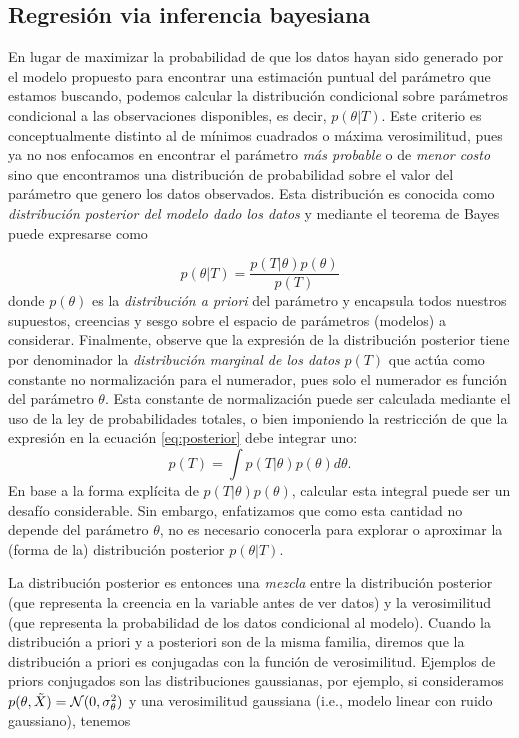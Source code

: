 \subsection{Regresión via inferencia bayesiana} %
\label{sub:inferencia_bayes}

En lugar de maximizar la probabilidad de que los datos hayan sido generado por el modelo propuesto para encontrar una estimación puntual del parámetro que estamos buscando, podemos calcular la distribución condicional sobre parámetros condicional a las observaciones disponibles, es decir, $p(\theta|T)$. Este criterio es conceptualmente distinto al de mínimos cuadrados o máxima verosimilitud, pues ya no nos enfocamos en encontrar el parámetro \emph{más probable} o de \emph{menor costo} sino que encontramos una distribución de probabilidad sobre el valor del parámetro que genero los datos observados. Esta distribución es conocida como \emph{distribución posterior del modelo dado los datos} y mediante el teorema de Bayes puede expresarse como

\begin{equation}
	p(\theta|T)=\frac{p(T|\theta)p(\theta)}{p(T)}
	\label{eq:posterior}
\end{equation}
donde $p(\theta)$ es la \emph{distribución a priori} del parámetro y encapsula todos nuestros supuestos, creencias y sesgo sobre el espacio de parámetros (modelos) a considerar. Finalmente, observe que la expresión de la distribución posterior tiene por denominador la \emph{distribución marginal de los datos} $p(T)$ que actúa como constante no normalización para el numerador, pues solo el numerador es función del parámetro $\theta$. Esta constante de normalización puede ser calculada mediante el uso de la ley de probabilidades totales, o bien imponiendo la restricción de que la expresión en la ecuación \eqref{eq:posterior} debe integrar uno:
\begin{equation}
	p(T) = \int p(T|\theta)p(\theta)d\theta.
\end{equation}
En base a la forma explícita de $p(T|\theta)p(\theta)$, calcular esta integral puede ser un desafío considerable. Sin embargo, enfatizamos que como esta cantidad no depende del parámetro $\theta$, no es necesario conocerla para explorar o aproximar la (forma de la) distribución posterior $p(\theta|T)$. 

La distribución posterior es entonces una \emph{mezcla} entre la distribución posterior (que representa la creencia en la variable antes de ver datos) y la verosimilitud (que representa la probabilidad de los datos condicional al modelo). Cuando la distribución a priori y a posteriori son de la misma familia, diremos que  la distribución a priori es conjugadas con la función de verosimilitud. Ejemplos de priors conjugados son las distribuciones gaussianas, por ejemplo, si consideramos $p(\theta,\tilde{X}) = {\mathcal N}(0,\sigma_\theta^2)$ y una verosimilitud gaussiana (i.e., modelo linear con ruido gaussiano), tenemos

